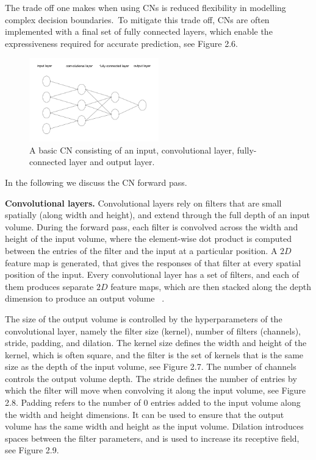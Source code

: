 \noindent The trade off one makes when using CNs is reduced flexibility in modelling complex decision boundaries.\ To mitigate this trade off, CNs are often implemented with a final set of fully connected layers, which enable the expressiveness required for accurate prediction, see Figure 2.6. \par

\begin{figure}[H]
   	\centering
    	\includegraphics[width=0.5\textwidth, height=0.3\textwidth]{convolutional_network}
	\captionsetup{justification=centering}
	\caption{A basic CN consisting of an input, convolutional layer, fully-connected layer and output layer.}
\end{figure}

\noindent In the following we discuss the CN forward pass. \par

\noindent \textbf{Convolutional layers.} Convolutional layers rely on filters that are small spatially (along width and height), and extend through the full depth of an input volume. During the forward pass, each filter is convolved across the width and height of the input volume, where the element-wise dot product is computed between the entries of the filter and the input at a particular position. A $ 2D $ feature map is generated, that gives the responses of that filter at every spatial position of the input. Every convolutional layer has a set of filters, and each of them produces separate $ 2D $ feature maps, which are then stacked along the depth dimension to produce an output volume \unskip ~\citep{DLIndaba2017}. \par

\noindent  The size of the output volume is controlled by the hyperparameters of the convolutional layer, namely the filter size (kernel), number of filters (channels), stride, padding, and dilation. The kernel size defines the width and height of the kernel, which is often square, and the filter is the set of kernels that is the same size as the depth of the input volume, see Figure 2.7. The number of channels controls the output volume depth. The stride defines the number of entries by which the filter will move when convolving it along the input volume, see Figure 2.8. Padding refers to the number of $ 0 $ entries added to the input volume along the width and height dimensions. It can be used to ensure that the output volume has the same width and height as the input volume. Dilation introduces spaces between the filter parameters, and is used to increase its receptive field, see Figure 2.9. \par

